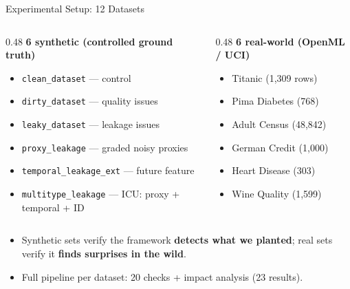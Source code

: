 \documentclass[11pt,aspectratio=169]{beamer}
\begin{document}
\begin{frame}{Experimental Setup: 12 Datasets}
  \begin{columns}[T]
    \begin{column}{0.48\textwidth}
      \textbf{6 synthetic (controlled ground truth)}
      \begin{itemize}\small\setlength\itemsep{0.3em}
        \item \texttt{clean\_dataset} --- control
        \item \texttt{dirty\_dataset} --- quality issues
        \item \texttt{leaky\_dataset} --- leakage issues
        \item \texttt{proxy\_leakage} --- graded noisy proxies
        \item \texttt{temporal\_leakage\_ext} --- future feature
        \item \texttt{multitype\_leakage} --- ICU: proxy + temporal + ID
      \end{itemize}
    \end{column}
    \begin{column}{0.48\textwidth}
      \textbf{6 real-world (OpenML / UCI)}
      \begin{itemize}\small\setlength\itemsep{0.3em}
        \item Titanic (1{,}309 rows)
        \item Pima Diabetes (768)
        \item Adult Census (48{,}842)
        \item German Credit (1{,}000)
        \item Heart Disease (303)
        \item Wine Quality (1{,}599)
      \end{itemize}
    \end{column}
  \end{columns}
  \vspace{0.8em}
  \begin{itemize}
    \item Synthetic sets verify the framework \textbf{detects what we planted}; real sets verify it \textbf{finds surprises in the wild}.
    \item Full pipeline per dataset: 20 checks + impact analysis (23 results).
  \end{itemize}
\end{frame}
\end{document}
